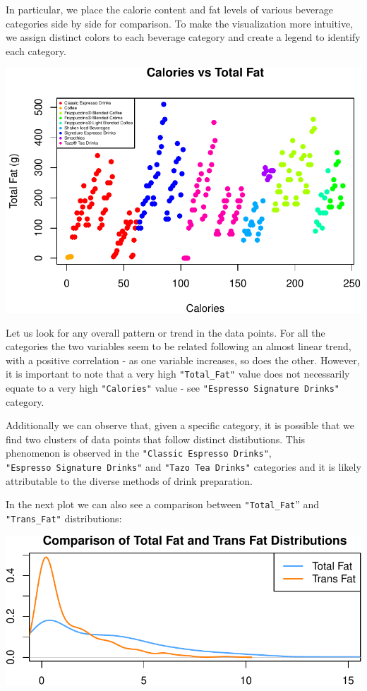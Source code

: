 \documentclass[
]{article}
\begin{document}
In particular, we place the calorie content and fat levels of various
beverage categories side by side for comparison. To make the
visualization more intuitive, we assign distinct colors to each beverage
category and create a legend to identify each category.

\begin{center}\includegraphics{Statistical_Learning_Final_Report_files/figure-latex/fat_comparison-1} \end{center}

Let us look for any overall pattern or trend in the data points. For all
the categories the two variables seem to be related following an almost
linear trend, with a positive correlation - as one variable increases,
so does the other. However, it is important to note that a very high
\texttt{"Total\_Fat"} value does not necessarily equate to a very high
\texttt{"Calories"} value - see \texttt{"Espresso\ Signature\ Drinks"}
category.

Additionally we can observe that, given a specific category, it is
possible that we find two clusters of data points that follow distinct
distibutions. This phenomenon is observed in the
\texttt{"Classic\ Espresso\ Drinks"},
\texttt{"Espresso\ Signature\ Drinks"} and \texttt{"Tazo\ Tea\ Drinks"}
categories and it is likely attributable to the diverse methods of drink
preparation.

In the next plot we can also see a comparison between
\texttt{"Total\_Fat}'' and \texttt{"Trans\_Fat"} distributions:

\begin{center}\includegraphics{Statistical_Learning_Final_Report_files/figure-latex/fat_comparison_-1} \end{center}
\end{document}
